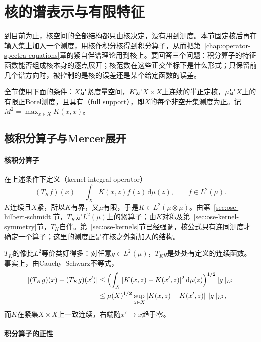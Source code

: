 
\section{核的谱表示与有限特征}
\label{sec:rkhs-spectral}

到目前为止，核空间的全部结构都只由核决定，没有用到测度。本节固定核后再在输入集上加入一个测度，用核作积分核得到积分算子，从而把第~\ref{chap:operator-spectra-equations}章的紧自伴谱理论用到核上。要回答三个问题：积分算子的特征函数能否组成核本身的逐点展开；核范数在这些正交坐标下是什么形式；只保留前几个谱方向时，被控制的是核的误差还是某个给定函数的误差。

全节使用下面的条件：$X$是紧度量空间，$K$是$X\times X$上连续的半正定核，$\mu$是$X$上的有限正Borel测度，且具有（full support），即$X$的每个非空开集测度为正。记$M^2=\max_{x\in X}K(x,x)$。

\subsection{核积分算子与Mercer展开}
\label{sec:rkhs-mercer}
\label{subsubsec:compact-spectrum-mercer}

\paragraph{核积分算子}

在上述条件下定义（kernel integral operator）
\[
(T_Kf)(x)=\int_XK(x,z)f(z)\,\mathrm d\mu(z),\qquad f\in L^2(\mu).
\]
$K$连续且$X$紧，所以$K$有界，又$\mu$有限，于是$K\in L^2(\mu\otimes\mu)$。由第~\ref{sec:ose-hilbert-schmidt}节，$T_K$是$L^2(\mu)$上的紧算子；由$K$对称及第~\ref{sec:ose-kernel-symmetry}节，$T_K$自伴。第~\ref{sec:ose-kernels}节已经强调，核公式只有连同测度才确定一个算子；这里的测度正是在核之外新加入的结构。

$T_K$的像比$L^2$等价类好得多：对任意$g\in L^2(\mu)$，$T_Kg$是处处有定义的连续函数。事实上，由Cauchy--Schwarz不等式，
\[
\begin{aligned}
|(T_Kg)(x)-(T_Kg)(x')|
&\le\Bigl(\int_X|K(x,z)-K(x',z)|^2\,\mathrm d\mu(z)\Bigr)^{1/2}\|g\|_{L^2}\\
&\le\mu(X)^{1/2}\sup_{z\in X}|K(x,z)-K(x',z)|\,\|g\|_{L^2},
\end{aligned}
\]
而$K$在紧集$X\times X$上一致连续，右端随$x'\to x$趋于零。

\paragraph{积分算子的正性}

